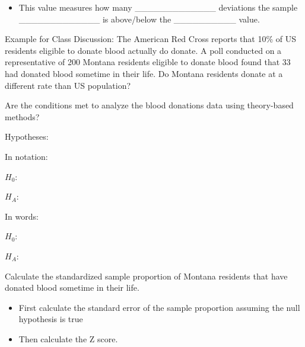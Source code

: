 \documentclass[
]{report}
\providecommand{\tightlist}{%
  \setlength{\itemsep}{0pt}\setlength{\parskip}{0pt}}
\begin{document}

\begin{itemize}
\tightlist
\item
  This value measures how many \_\_\_\_\_\_\_\_\_\_\_\_\_ deviations the sample \_\_\_\_\_\_\_\_\_\_\_\_\_ is above/below the \_\_\_\_\_\_\_\_\_\_ value.
\end{itemize}


Example for Class Discussion: The American Red Cross reports that 10\% of US residents eligible to donate blood actually do donate. A poll conducted on a representative of 200 Montana residents eligible to donate blood found that 33 had donated blood sometime in their life. Do Montana residents donate at a different rate than US population?

Are the conditions met to analyze the blood donations data using theory-based methods?

\vspace{1in}

Hypotheses:

In notation:

\(H_0:\)

\vspace{0.2in}

\(H_A:\)

\vspace{0.2in}

In words:

\(H_0:\)

\vspace{0.6in}

\(H_A:\)

\vspace{0.6in}

\newpage

Calculate the standardized sample proportion of Montana residents that have donated blood sometime in their life.

\begin{itemize}
\tightlist
\item
  First calculate the standard error of the sample proportion assuming the null hypothesis is true
\end{itemize}

\vspace{0.5in}

\begin{itemize}
\tightlist
\item
  Then calculate the Z score.
\end{itemize}
\end{document}
